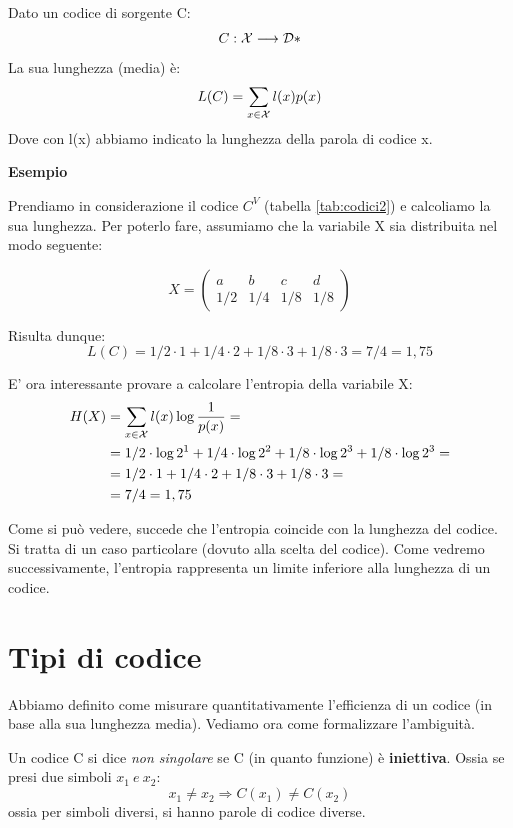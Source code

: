 \begin{definizione} 
\mbox{}

Dato un codice di sorgente C:
\[C: \mathcal{X} \longrightarrow \mathcal{D}*\]
La sua lunghezza (media) è:
\[L(C) = \sum_{x \in \mathcal{X}}l(x) p(x)\]
Dove con l(x) abbiamo indicato la lunghezza della parola di codice x.
\label{lunghezza}
\end{definizione}

\noindent
\textbf{Esempio}

\noindent
Prendiamo in considerazione il codice $C^V$ (tabella \ref{tab:codici2}) e calcoliamo la sua lunghezza.
Per poterlo fare, assumiamo che la variabile X sia distribuita nel modo seguente:

\[X = \left(\begin{array}{cccc}a & b & c & d \\1/2 & 1/4 & 1/8 & 1/8\end{array}\right)\]

Risulta dunque:
\[L(C) = 1/2 \cdot 1 + 1/4 \cdot 2 + 1/8 \cdot 3 + 1/8 \cdot 3 = 7/4 = 1,75\]

E' ora interessante provare a calcolare l'entropia della variabile X:
\[
\begin{split}
H(X)&= \sum_{x \in \mathcal{X}}l(x) \log \frac{1}{p(x)} = \\
&= 1/2 \cdot \log 2^1 + 1/4 \cdot \log 2^2 + 1/8 \cdot \log 2^3 + 1/8 \cdot \log 2^3 = \\
&= 1/2 \cdot 1 + 1/4 \cdot 2 + 1/8 \cdot 3 + 1/8 \cdot 3 = \\
&= 7/4 = 1,75
\end{split}
\]

Come si può vedere, succede che l'entropia coincide con la lunghezza del codice. Si tratta di un caso particolare (dovuto
alla scelta del codice). Come vedremo successivamente, l'entropia rappresenta un limite inferiore alla lunghezza di un codice.

\section{Tipi di codice}
Abbiamo definito come misurare quantitativamente l'efficienza di un codice (in base alla sua lunghezza media).
Vediamo ora come formalizzare l'ambiguità.

\begin{definizione} 
Un codice C si dice \textit{non singolare} se C (in quanto funzione) è \textbf{iniettiva}. 
Ossia se presi due simboli \(x_1 \ e \ x_2\):
\[x_1 \neq x_2 \Rightarrow C(x_1) \neq C(x_2)\]
ossia per simboli diversi, si hanno parole di codice diverse.
\end{definizione}

